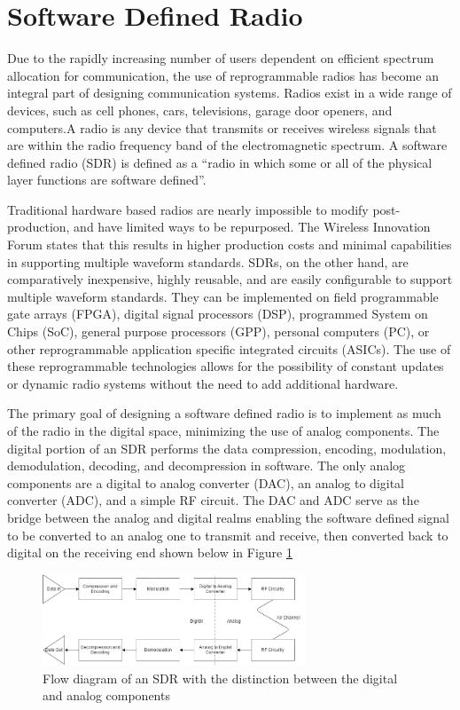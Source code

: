\section{Software Defined Radio}
Due to the rapidly increasing number of users dependent on efficient spectrum allocation for communication, the use of reprogrammable radios has become an integral part of designing communication systems. Radios exist in a wide range of devices, such as cell phones, cars, televisions, garage door openers, and computers.A radio is any device that transmits or receives wireless signals that are within the radio frequency band of the electromagnetic spectrum. A software defined radio (SDR) is defined as a “radio in which some or all of the physical layer functions are software defined”. \par
Traditional hardware based radios are nearly impossible to modify post-production, and have limited ways to be repurposed. The Wireless Innovation Forum states that this results in higher production costs and minimal capabilities in supporting multiple waveform standards. SDRs, on the other hand, are comparatively inexpensive, highly reusable, and are easily configurable to support multiple waveform standards. They can be implemented on field programmable gate arrays (FPGA), digital signal processors (DSP), programmed System on Chips (SoC), general purpose processors (GPP), personal computers (PC), or other reprogrammable application specific integrated circuits (ASICs). The use of these reprogrammable technologies allows for the possibility of constant updates or dynamic radio systems without the need to add additional hardware. \par
The primary goal of designing a software defined radio is to implement as much of the radio in the digital space, minimizing the use of analog components. The digital portion of an SDR performs the data compression, encoding, modulation, demodulation, decoding, and decompression in software. The only analog components are a digital to analog converter (DAC), an analog to digital converter (ADC), and a simple RF circuit. The DAC and ADC serve as the bridge between the analog and digital realms enabling the software defined signal to be converted to an analog one to transmit and receive, then converted back to digital on the receiving end shown below in Figure \ref{fig:sdr_flow_diagram}
\begin{figure}[ht]
\centering
\includegraphics[width=0.70\textwidth]{img/sdr_diagram.png}
\caption{Flow diagram of an SDR with the distinction between the digital and analog components}
\label{fig:sdr_flow_diagram}
\end{figure}\par
